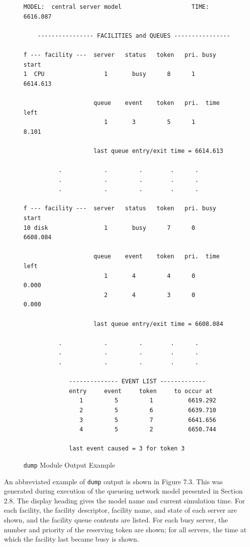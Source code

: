 \begin{figure}[p]
\centering
\begin{minipage}{\textwidth}
\scriptsize
\begin{verbatim}
MODEL:  central server model                    TIME:    6616.087

    ---------------- FACILITIES and QUEUES ----------------

f --- facility ---  server   status   token   pri. busy start
1  CPU                 1       busy      8      1     6614.613

                    queue    event    token   pri.  time left
                       1       3         5      1        8.101

                    last queue entry/exit time = 6614.613

          .            .         .        .      .
          .            .         .        .      .
          .            .         .        .      .

f --- facility ---  server   status   token   pri. busy start
10 disk                1       busy      7      0     6608.084

                    queue    event    token   pri.  time left
                       1       4         4      0        0.000
                       2       4         3      0        0.000

                    last queue entry/exit time = 6608.084

          .            .         .        .      .
          .            .         .        .      .
          .            .         .        .      .

             -------------- EVENT LIST -------------
             entry     event     token     to occur at
                1         5         1          6619.292
                2         5         6          6639.710
                3         5         7          6641.656
                4         5         2          6650.744

             last event caused = 3 for token 3
\end{verbatim}
\end{minipage}
\caption{\texttt{dump} Module Output Example}
\label{fig:smpl-dump-example}
\end{figure}

An abbreviated example of \texttt{dump} output is shown in Figure 7.3. This was
generated during execution of the queueing network model presented in
Section 2.8. The display heading gives the model name and current simulation
time. For each facility, the facility descriptor, facility name, and
state of each server are shown, and the facility queue contents are listed. For
each busy server, the number and priority of the reserving token are shown;
for all servers, the time at which the facility last became busy is shown.

